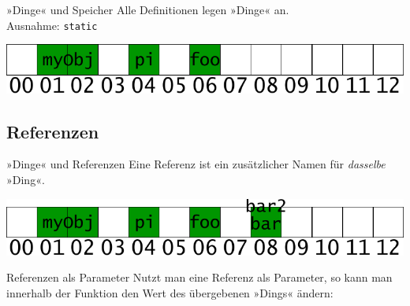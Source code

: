 \begin{frame}[fragile]{»Dinge« und Speicher}
	Alle Definitionen legen »Dinge« an.\\
	{\tiny Ausnahme: \verb|static|}
	
	{\footnotesize
	\begin{block}{}
		
	\end{block}
	}
	
	\pause
	\vspace{1em}
	
	\includegraphics[width=\linewidth]{images/object_things}
\end{frame}


\subsection{Referenzen}

\begin{frame}[fragile]{»Dinge« und Referenzen}
	Eine Referenz ist ein zusätzlicher Namen für \emph{dasselbe} »Ding«.
	
	{\footnotesize
	\begin{block}{}
		
	\end{block}
	}
	
	\pause
	\vspace{1em}
	
	\includegraphics[width=\linewidth]{images/object_refs}
\end{frame}

\begin{frame}[fragile]{Referenzen als Parameter}
	Nutzt man eine Referenz als Parameter, so kann man innerhalb der Funktion den Wert des übergebenen »Dings« ändern:
	
	{\footnotesize
	\begin{block}{}
		
	\end{block}
	}
	
	\pause
	
	{\footnotesize
	\begin{block}{}
		
	\end{block}
	}
\end{frame}


